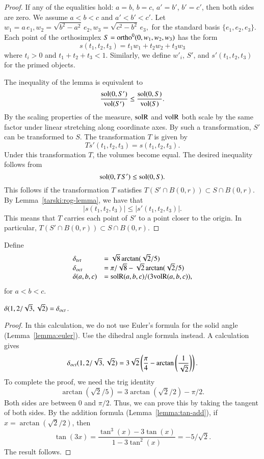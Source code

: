 \begin{proof} If any of the equalities hold: $a=b$, $b=c$, $a'=b'$,
$b'=c'$, then both sides are zero.  We assume $a<b<c$ and $a'<b'<c'$.
Let $w_1=a\,e_1,w_2=\sqrt{b^2-a^2}\, e_2,w_3=\sqrt{c^2-b^2}\, e_3,$
for the standard basis $\{e_1,e_2,e_3\}$.  Each point of the orthosimplex
$S = {\operatorname{ortho}}^0(0,w_1,w_2,w_3)$ has
the form
   $$s(t_1,t_2,t_3) = t_1 w_1 + t_2 w_2 + t_3 w_3$$
where $t_i>0$ and $t_1+t_2+t_3< 1$.  Similarly,
we define $w'_i$, $S'$, and $s'(t_1,t_2,t_3)$ for the primed objects.

The inequality of the lemma is equivalent to
  $$
  \frac{\operatorname{sol}(0,S')}{{\operatorname{vol}}(S')} \le \frac{\operatorname{sol}(0,S)}{{\operatorname{vol}}(S)}.
  $$
By the scaling properties of the measure, ${\operatorname{solR}}$ and ${\operatorname{volR}}$ both
scale by the same factor under linear stretching along coordinate axes.
By such a transformation, $S'$ can be transformed to $S$.  The
transformation $T$ is given by 
   $$
   T s'(t_1,t_2,t_3) = s(t_1,t_2,t_3).
   $$
Under this transformation $T$, the volumes become equal.
The desired inequality follows from
   $$
   \operatorname{sol}(0,T S') \le \operatorname{sol}(0,S).
   $$
This follows if the transformation $T$ satisfies
   $T(S'\cap B(0,r))\subset S\cap B(0,r)$.
By Lemma~\ref{tarski:rog-lemma}, we have that 
   $$|s(t_1,t_2,t_3)|\le |s'(t_1,t_2,t_3)|.$$
This means that $T$ carries each point of $S'$ to a point closer to
the origin.  In particular,
  $T(S'\cap B(0,r))\subset S\cap B(0,r)$.
\end{proof}

\begin{definition}  Define 
  $$
  \begin{array}{lll}
  \delta_{tet} &= \sqrt8 \arctan(\sqrt2/5)\\
  \delta_{oct} &= \pi/\sqrt8 - \sqrt2 \arctan(\sqrt2/5)\\
  \delta(a,b,c)&= {\operatorname{solR}}(a,b,c)/(3{\operatorname{volR}}(a,b,c)),
  \end{array}
  $$
for $a<b<c$.  
\end{definition}

\begin{lemma}
  $\delta(1,2/\sqrt{3},\sqrt2)=\delta_{oct}$.
\end{lemma}

\begin{proof}  In this calculation, we do not use Euler's formula
for the solid angle (Lemma~\ref{lemma:euler}).  
Use the dihedral angle formula instead.
A calculation gives
  $$
  \delta_{oct}(1,2/\sqrt{3},\sqrt2)=
  3 \sqrt{2} \left(\frac{\pi }{4}-\arctan
   \left(\frac{1}{\sqrt{2}}\right)\right).$$
To complete the proof, we need the trig identity
  $$\arctan(\sqrt2/5)  = 3\arctan(\sqrt2/2)-\pi/2.$$
Both sides are between $0$ and $\pi/2$.  Thus, we can prove this
by taking the tangent of both sides. By the addition formula
(Lemma~\ref{lemma:tan-add}),
if $x=\arctan(\sqrt2/2)$, then
   $$\tan(3 x) = \frac{\tan^3(x) - 3\tan(x)}{1-3 \tan^2(x)} = -5/\sqrt2.$$
The result follows.
\end{proof}

